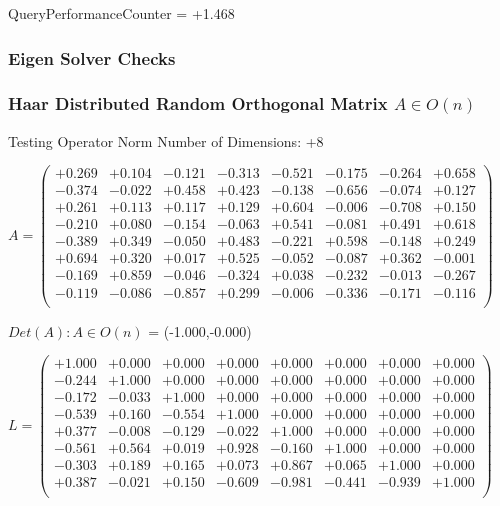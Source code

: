 \documentclass[9pt]{article}
\theoremstyle{plain}
\theoremstyle{definition}
\theoremstyle{remark}
\numberwithin{equation}{section}
\begin{document}
QueryPerformanceCounter  =  +1.468
\subsubsection{Eigen Solver Checks}
\subsubsection{Haar Distributed Random Orthogonal Matrix $A \in O(n)$}
 Testing Operator Norm
Number of Dimensions: +8

$A = \left(
\begin{array}{
cccccccc}
+0.269 & +0.104 & -0.121 & -0.313 & -0.521 & -0.175 & -0.264 & +0.658 \\
-0.374 & -0.022 & +0.458 & +0.423 & -0.138 & -0.656 & -0.074 & +0.127 \\
+0.261 & +0.113 & +0.117 & +0.129 & +0.604 & -0.006 & -0.708 & +0.150 \\
-0.210 & +0.080 & -0.154 & -0.063 & +0.541 & -0.081 & +0.491 & +0.618 \\
-0.389 & +0.349 & -0.050 & +0.483 & -0.221 & +0.598 & -0.148 & +0.249 \\
+0.694 & +0.320 & +0.017 & +0.525 & -0.052 & -0.087 & +0.362 & -0.001 \\
-0.169 & +0.859 & -0.046 & -0.324 & +0.038 & -0.232 & -0.013 & -0.267 \\
-0.119 & -0.086 & -0.857 & +0.299 & -0.006 & -0.336 & -0.171 & -0.116 \\
\end{array}
\right)$ \newline 

$Det(A) :   A \in O(n)$ = (-1.000,-0.000)

$L = \left(
\begin{array}{
cccccccc}
+1.000 & +0.000 & +0.000 & +0.000 & +0.000 & +0.000 & +0.000 & +0.000 \\
-0.244 & +1.000 & +0.000 & +0.000 & +0.000 & +0.000 & +0.000 & +0.000 \\
-0.172 & -0.033 & +1.000 & +0.000 & +0.000 & +0.000 & +0.000 & +0.000 \\
-0.539 & +0.160 & -0.554 & +1.000 & +0.000 & +0.000 & +0.000 & +0.000 \\
+0.377 & -0.008 & -0.129 & -0.022 & +1.000 & +0.000 & +0.000 & +0.000 \\
-0.561 & +0.564 & +0.019 & +0.928 & -0.160 & +1.000 & +0.000 & +0.000 \\
-0.303 & +0.189 & +0.165 & +0.073 & +0.867 & +0.065 & +1.000 & +0.000 \\
+0.387 & -0.021 & +0.150 & -0.609 & -0.981 & -0.441 & -0.939 & +1.000 \\
\end{array}
\right)$ \newline 
\end{document}
